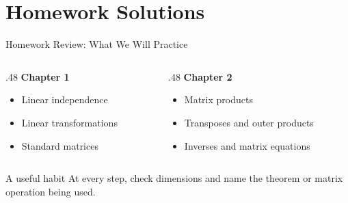 \section[Homework]{Homework Solutions}

\begin{frame}{Homework Review: What We Will Practice}
\begin{columns}[T,onlytextwidth]
  \begin{column}{.48\textwidth}
    \textbf{Chapter 1}
    \begin{itemize}
      \item Linear independence
      \item Linear transformations
      \item Standard matrices
    \end{itemize}
  \end{column}
  \begin{column}{.48\textwidth}
    \textbf{Chapter 2}
    \begin{itemize}
      \item Matrix products
      \item Transposes and outer products
      \item Inverses and matrix equations
    \end{itemize}
  \end{column}
\end{columns}
\medskip
\begin{block}{A useful habit}
At every step, check dimensions and name the theorem or matrix operation being used.
\end{block}
\end{frame}

